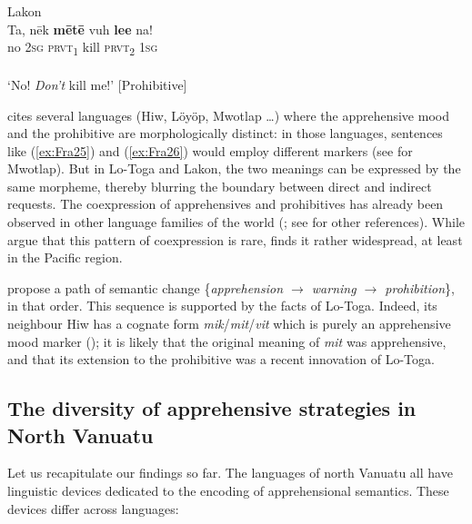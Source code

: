 \documentclass[output=paper,colorlinks,citecolor=brown]{langscibook}
\begin{document}
\ea \label{ex:Fra28} \textnormal{Lakon}  \\
\gll Ta, nēk \textbf{mētē} vuh \textbf{lee} na! \\
no \textsc{2sg} \textsc{prvt}\textsubscript{1} kill \textsc{prvt}\textsubscript{2} \textsc{1sg} \\
 \\
`No! \textit{Don't} kill me!' \hfill [Prohibitive]
\z

 cites several languages (Hiw, Löyöp, Mwotlap {\ldots}) where the apprehensive mood and the prohibitive are morphologically distinct: in those languages, sentences like (\ref{ex:Fra25}) and (\ref{ex:Fra26}) would employ different markers (see  for Mwotlap). But in Lo-Toga and Lakon, the two meanings can be expressed by the same morpheme, thereby blurring the boundary between direct and indirect requests. 
The coexpression of apprehensives and prohibitives has already been observed in other language families of the world (\citealt[50--63]{Dobrushina2006}; see \citet{chapters/introduction} for other references). While \citet{pakendorfschalley2007} argue that this pattern of coexpression is rare, \citet[453]{smithdennis2021} finds it rather widespread, at least in the Pacific region. 

\citet[525]{pakendorfschalley2007} propose a path of semantic change \{\textit{apprehension $\rightarrow$ warning $\rightarrow$ prohibition}\}, in that order. This sequence is supported by the facts of Lo-Toga. Indeed, its neighbour Hiw has a cognate form \textit{mik}/\textit{mit}/\textit{vit} which is purely an apprehensive mood marker (); it is likely that the original meaning of \textit{mit} was apprehensive, and that its extension to the prohibitive was a recent innovation of Lo-Toga.



\subsection{The diversity of apprehensive strategies in North Vanuatu}
\label{subsec:synthesis}

Let us recapitulate our findings so far. The languages of north Vanuatu all have linguistic devices dedicated to the encoding of apprehensional semantics. These devices differ across languages: 
\end{document}
